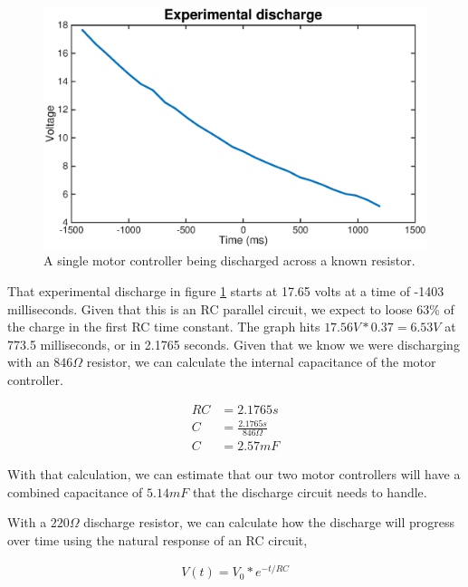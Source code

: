 \documentclass{article}
\begin{document}
            \begin{figure}[H]
                \centering
                \includegraphics[width = 0.8  \textwidth]{experimental_discharge.eps}
                \caption{A single motor controller being discharged across a known resistor.}
                \label{discharge}
            \end{figure}

            That experimental discharge in figure \ref{discharge} starts at 17.65 volts at a time of -1403 milliseconds. Given that this is an RC parallel circuit, we expect to loose 63\% of the charge in the first RC time constant. The graph hits $17.56 V * 0.37 = 6.53 V$ at 773.5 milliseconds, or in 2.1765 seconds. Given that we know we were discharging with an $846 \Omega$ resistor, we can calculate the internal capacitance of the motor controller.

            \begin{align}
                RC &= 2.1765 s\\
                C &= \frac{2.1765 s}{846 \Omega}\\
                C &= 2.57 mF
            \end{align}

            With that calculation, we can estimate that our two motor controllers will have a combined capacitance of $5.14 mF$ that the discharge circuit needs to handle.

            With a $220 \Omega$ discharge resistor, we can calculate how the discharge will progress over time using the natural response of an RC circuit,

            \begin{align}
                V(t) = V_{0} * e^{-t/RC}
            \end{align}
\end{document}
